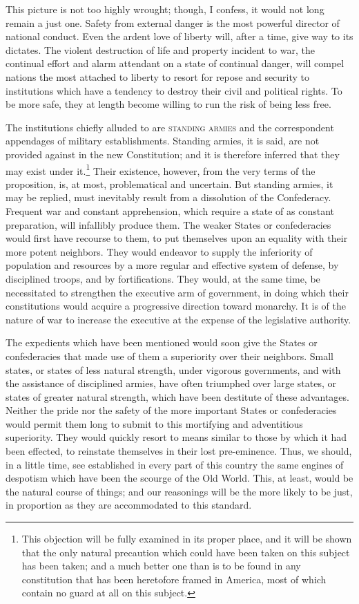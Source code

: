 This picture is not too highly wrought; though, I confess, it would not long remain a just one. Safety from external danger is the most powerful director of national conduct. Even the ardent love of liberty will, after a time, give way to its dictates. The violent destruction of life and property incident to war, the continual effort and alarm attendant on a state of continual danger, will compel nations the most attached to liberty to resort for repose and security to institutions which have a tendency to destroy their civil and political rights. To be more safe, they at length become willing to run the risk of being less free.

The institutions chiefly alluded to are \textsc{standing armies }and the correspondent appendages of military establishments. Standing armies, it is said, are not provided against in the new Constitution; and it is therefore inferred that they may exist under it.\footnote{This objection will be fully examined in its proper place, and it will be shown that the only natural precaution which could have been taken on this subject has been taken; and a much better one than is to be found in any constitution that has been heretofore framed in America, most of which contain no guard at all on this subject.} Their existence, however, from the very terms of the proposition, is, at most, problematical and uncertain. But standing armies, it may be replied, must inevitably result from a dissolution of the Confederacy. Frequent war and constant apprehension, which require a state of as constant preparation, will infallibly produce them. The weaker States or confederacies would first have recourse to them, to put themselves upon an equality with their more potent neighbors. They would endeavor to supply the inferiority of population and resources by a more regular and effective system of defense, by disciplined troops, and by fortifications. They would, at the same time, be necessitated to strengthen the executive arm of government, in doing which their constitutions would acquire a progressive direction toward monarchy. It is of the nature of war to increase the executive at the expense of the legislative authority.

The expedients which have been mentioned would soon give the States or confederacies that made use of them a superiority over their neighbors. Small states, or states of less natural strength, under vigorous governments, and with the assistance of disciplined armies, have often triumphed over large states, or states of greater natural strength, which have been destitute of these advantages. Neither the pride nor the safety of the more important States or confederacies would permit them long to submit to this mortifying and adventitious superiority. They would quickly resort to means similar to those by which it had been effected, to reinstate themselves in their lost pre-eminence. Thus, we should, in a little time, see established in every part of this country the same engines of despotism which have been the scourge of the Old World. This, at least, would be the natural course of things; and our reasonings will be the more likely to be just, in proportion as they are accommodated to this standard.

